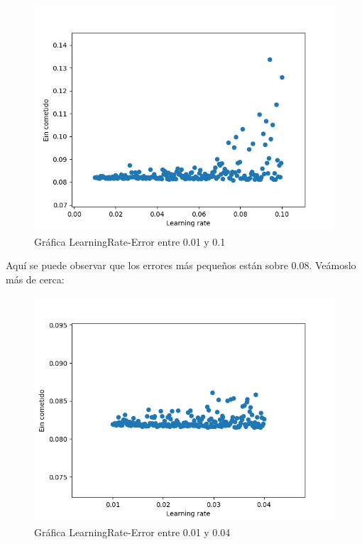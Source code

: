 \begin{figure}[H] %
	\centering
	\includegraphics[scale=0.6]{error2.png}  %
	\caption{Gráfica LearningRate-Error entre 0.01 y 0.1} 
	\label{fig:error2}
\end{figure}

Aquí se puede observar que los errores más pequeños están sobre 0.08. Veámoslo más de cerca:

\begin{figure}[H] %
	\centering
	\includegraphics[scale=0.6]{error3.png}  %
	\caption{Gráfica LearningRate-Error entre 0.01 y 0.04} 
	\label{fig:error3}
\end{figure}

